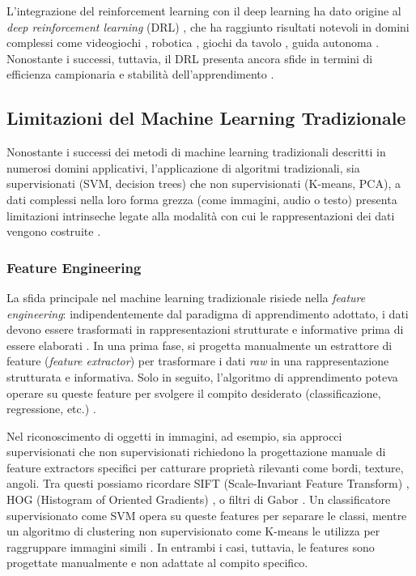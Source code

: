 L'integrazione del reinforcement learning con il deep learning ha dato origine al \textit{deep reinforcement learning} (DRL) \cite{arulkumaran2017, li2017deep}, che ha raggiunto risultati notevoli in domini complessi come videogiochi \cite{mnih2015}, robotica \cite{levine2016}, giochi da tavolo \cite{silver2016}, guida autonoma \cite{kiran2021}. Nonostante i successi, tuttavia, il DRL presenta ancora sfide in termini di efficienza campionaria e stabilità dell'ap\-pren\-di\-men\-to \cite{wang2020deep}.


\subsection{Limitazioni del Machine Learning Tradizionale}
\label{sec:limitazioni_ml}

Nonostante i successi dei metodi di machine learning tradizionali descritti in numerosi domini applicativi, l'ap\-pli\-ca\-zio\-ne di algoritmi tradizionali, sia supervisionati (SVM, decision trees) che non supervisionati (K-means, PCA), a dati complessi 
nella loro forma grezza (come immagini, audio o testo) presenta limitazioni intrinseche legate alla modalità con cui le rappresentazioni dei dati vengono costruite \cite{lecun2015deep, bengio2013representation}.

\subsubsection{Feature Engineering}

La sfida principale nel machine learning tradizionale risiede nella \textit{feature engineering}: indipendentemente dal paradigma di apprendimento adottato, i dati devono essere trasformati in rappresentazioni strutturate e informative prima di essere elaborati \cite{lecun2015deep, domingos2012few}. In una prima fase, si progetta manualmente un estrattore di feature (\textit{feature extractor}) per trasformare i dati \textit{raw} in una rappresentazione strutturata e informativa. Solo in seguito, l'algoritmo di apprendimento poteva operare su queste feature per svolgere il compito desiderato (classificazione, regressione, etc.) \cite{goodfellow2016deep}.

Nel riconoscimento di oggetti in immagini, ad esempio, sia approcci supervisionati che non supervisionati richiedono la progettazione manuale di feature extractors specifici per catturare proprietà rilevanti come bordi, texture, angoli. Tra questi possiamo ricordare SIFT (Scale-Invariant Feature Transform) \cite{lowe2004distinctive}, HOG (Histogram of Oriented Gradients) \cite{dalal2005histograms}, o filtri di Gabor \cite{daugman1985uncertainty}. Un classificatore supervisionato come SVM opera su queste features per separare le classi, mentre un algoritmo di clustering non supervisionato come K-means le utilizza per raggruppare immagini simili \cite{murphy2012}. In entrambi i casi, tuttavia, le features sono progettate manualmente e non adattate al compito specifico.

